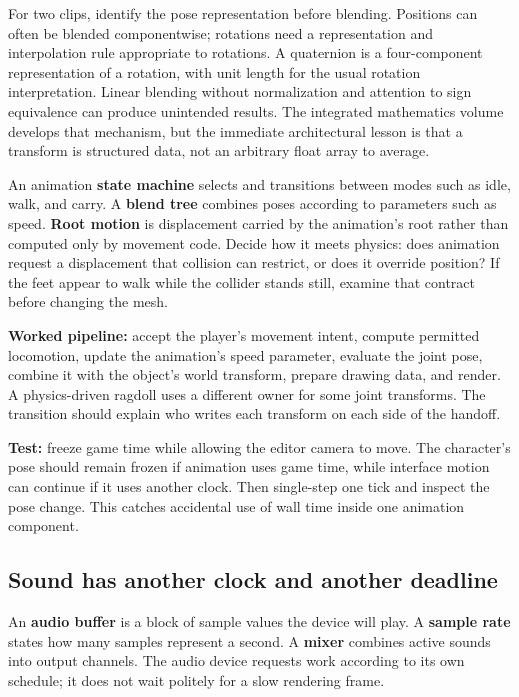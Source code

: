 For two clips, identify the pose representation before blending. Positions can often be blended componentwise; rotations need a representation and interpolation rule appropriate to rotations. A quaternion is a four-component representation of a rotation, with unit length for the usual rotation interpretation. Linear blending without normalization and attention to sign equivalence can produce unintended results. The integrated mathematics volume develops that mechanism, but the immediate architectural lesson is that a transform is structured data, not an arbitrary float array to average.

An animation \textbf{state machine} selects and transitions between modes such as idle, walk, and carry. A \textbf{blend tree} combines poses according to parameters such as speed. \textbf{Root motion} is displacement carried by the animation's root rather than computed only by movement code. Decide how it meets physics: does animation request a displacement that collision can restrict, or does it override position? If the feet appear to walk while the collider stands still, examine that contract before changing the mesh.

\textbf{Worked pipeline:} accept the player's movement intent, compute permitted locomotion, update the animation's speed parameter, evaluate the joint pose, combine it with the object's world transform, prepare drawing data, and render. A physics-driven ragdoll uses a different owner for some joint transforms. The transition should explain who writes each transform on each side of the handoff.

\textbf{Test:} freeze game time while allowing the editor camera to move. The character's pose should remain frozen if animation uses game time, while interface motion can continue if it uses another clock. Then single-step one tick and inspect the pose change. This catches accidental use of wall time inside one animation component.

\subsection{Sound has another clock and another deadline}\label{06-engine-ii-ch040-sound-has-another-clock-and-another-deadline}

An \textbf{audio buffer} is a block of sample values the device will play. A \textbf{sample rate} states how many samples represent a second. A \textbf{mixer} combines active sounds into output channels. The audio device requests work according to its own schedule; it does not wait politely for a slow rendering frame.

